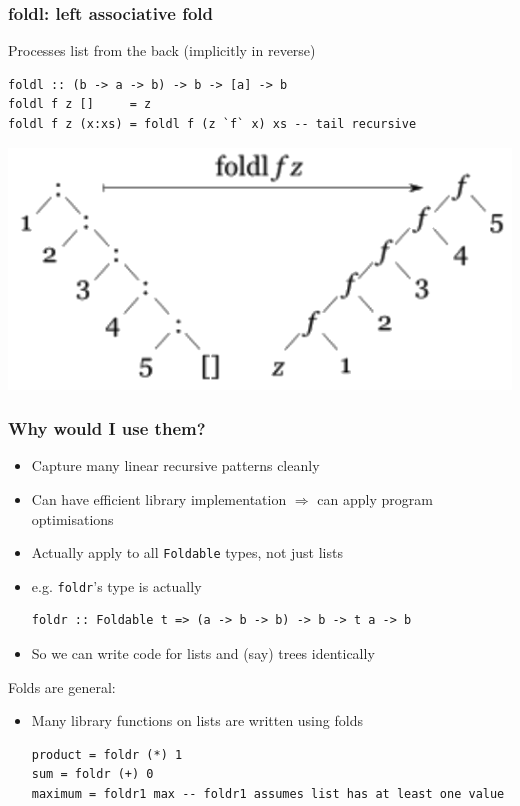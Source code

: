 \documentclass{article}[18pt]
\begin{document}
\subsubsection{foldl: left associative fold}
Processes list from the back (implicitly in reverse)
\begin{verbatim}
foldl :: (b -> a -> b) -> b -> [a] -> b
foldl f z []     = z
foldl f z (x:xs) = foldl f (z `f` x) xs -- tail recursive
\end{verbatim}
\begin{center}
	\includegraphics[scale=0.6]{foldl}
\end{center}
\subsubsection{Why would I use them?}
\begin{itemize}
	\item Capture many linear recursive patterns cleanly
	\item Can have efficient library implementation $\Rightarrow$ can apply program optimisations
	\item Actually apply to all \texttt{Foldable} types, not just lists
	\item e.g. \texttt{foldr}'s type is actually
\begin{verbatim}
foldr :: Foldable t => (a -> b -> b) -> b -> t a -> b
\end{verbatim}
	\item So we can write code for lists and (say) trees identically
\end{itemize}
Folds are general:
\begin{itemize}
	\item Many library functions on lists are written using folds
\begin{verbatim}
product = foldr (*) 1
sum = foldr (+) 0
maximum = foldr1 max -- foldr1 assumes list has at least one value
\end{verbatim}
\end{itemize}
\end{document}
